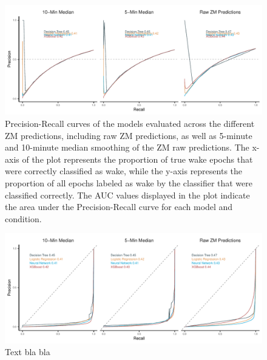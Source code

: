\documentclass[
  super,
  preprint,
  3p]{elsarticle}
\begin{document}
\begin{figure}[b]

{\centering \includegraphics{visuals/plot_sleep_pr.pdf}

}

\caption{\label{fig-pr_curves}Precision-Recall curves of the models
evaluated across the different ZM predictions, including raw ZM
predictions, as well as 5-minute and 10-minute median smoothing of the
ZM raw predictions. The x-axis of the plot represents the proportion of
true wake epochs that were correctly classified as wake, while the
y-axis represents the proportion of all epochs labeled as wake by the
classifier that were classified correctly. The AUC values displayed in
the plot indicate the area under the Precision-Recall curve for each
model and condition.}

\end{figure}

\begin{figure}[b]

{\centering \includegraphics{visuals/plot_sleep_roc.pdf}

}

\caption{\label{fig-roc_curves}Text bla bla}

\end{figure}

\newpage


\renewcommand\refname{References}
  
\end{document}
